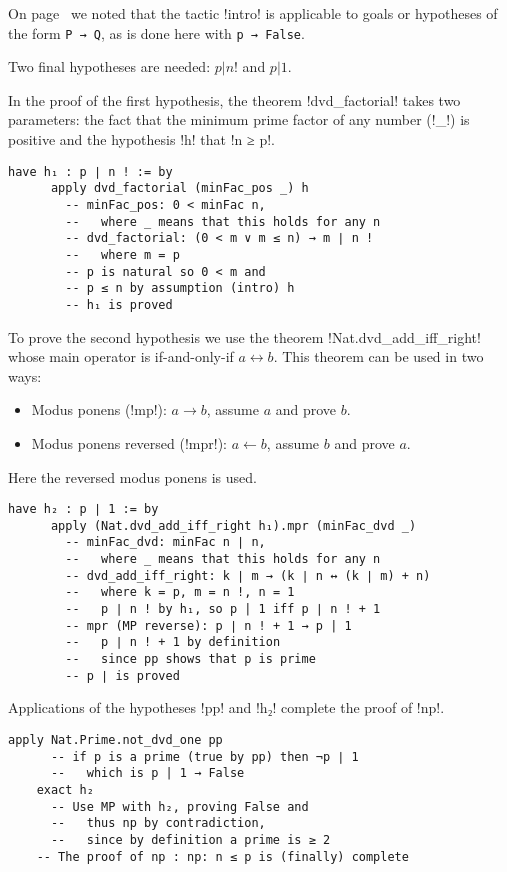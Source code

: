 On page~\pageref{p.intro} we noted that the tactic !intro! is applicable to goals or hypotheses of the form \Verb+P → Q+, as is done here with \Verb+p → False+.

Two final hypotheses are needed: \UndefineShortVerb{\!}$p | n!$\DefineShortVerb{\!} and $p | 1$.

In the proof of the first hypothesis, the theorem !dvd_factorial! takes two parameters: the fact that the minimum prime factor of any number (!_!) is positive and the hypothesis !h! that !n ≥ p!.
\begin{Verbatim}[firstnumber=last]
    have h₁ : p ∣ n ! := by
      apply dvd_factorial (minFac_pos _) h
        -- minFac_pos: 0 < minFac n,
        --   where _ means that this holds for any n
        -- dvd_factorial: (0 < m ∨ m ≤ n) → m ∣ n !
        --   where m = p
        -- p is natural so 0 < m and
        -- p ≤ n by assumption (intro) h
        -- h₁ is proved
\end{Verbatim}

To prove the second hypothesis we use the theorem !Nat.dvd_add_iff_right! whose main operator is if-and-only-if $a \leftrightarrow b$. This theorem can be used in two ways:
\begin{itemize}
\item Modus ponens (!mp!): $a \rightarrow b$, assume $a$ and prove $b$.
\item Modus ponens reversed (!mpr!): $a \leftarrow b$, assume $b$ and prove $a$.
\end{itemize}
Here the reversed modus ponens is used.
\begin{Verbatim}[firstnumber=last]
    have h₂ : p ∣ 1 := by
      apply (Nat.dvd_add_iff_right h₁).mpr (minFac_dvd _)
        -- minFac_dvd: minFac n ∣ n,
        --   where _ means that this holds for any n
        -- dvd_add_iff_right: k ∣ m → (k ∣ n ↔ (k ∣ m) + n)
        --   where k = p, m = n !, n = 1
        --   p ∣ n ! by h₁, so p | 1 iff p ∣ n ! + 1
        -- mpr (MP reverse): p ∣ n ! + 1 → p | 1
        --   p ∣ n ! + 1 by definition
        --   since pp shows that p is prime
        -- p ∣ is proved
\end{Verbatim}

Applications of the hypotheses !pp! and !h₂! complete the proof of !np!.
\begin{Verbatim}[firstnumber=last]
    apply Nat.Prime.not_dvd_one pp
      -- if p is a prime (true by pp) then ¬p ∣ 1
      --   which is p | 1 → False
    exact h₂
      -- Use MP with h₂, proving False and
      --   thus np by contradiction,
      --   since by definition a prime is ≥ 2
    -- The proof of np : np: n ≤ p is (finally) complete
\end{Verbatim}

